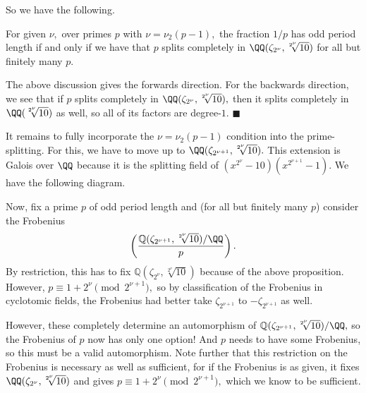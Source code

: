 So we have the following.
\begin{proposition}
    For given $\nu,$ over primes $p$ with $\nu=\nu_2(p-1),$ the fraction $1/p$ has odd period length if and only if we have that $p$ splits completely in $\QQ(\zeta_{2^\nu},\sqrt[2^\nu]{10})$ for all but finitely many $p.$
\end{proposition}
The above discussion gives the forwards direction. For the backwards direction, we see that if $p$ splits completely in $\QQ(\zeta_{2^\nu},\sqrt[2^\nu]{10}),$ then it splits completely in $\QQ(\sqrt[2^\nu]{10})$ as well, so all of its factors are degree-$1.$ $\blacksquare$

It remains to fully incorporate the $\nu=\nu_2(p-1)$ condition into the prime-splitting. For this, we have to move up to $\QQ(\zeta_{2^{\nu+1}},\sqrt[2^\nu]{10}).$ This extension is Galois over $\QQ$ because it is the splitting field of $\left(x^{2^\nu}-10\right)\left(x^{2^{\nu+1}}-1\right).$ We have the following diagram.
\begin{center}
\end{center}
Now, fix a prime $p$ of odd period length and (for all but finitely many $p$) consider the Frobenius
\[\left(\frac{\mathbb Q(\zeta_{2^{\nu+1}},\sqrt[2^\nu]{10})/\QQ}p\right).\]
By restriction, this has to fix $\mathbb Q(\zeta_{2^\nu},\sqrt[2^\nu]{10})$ because of the above proposition. However, $p\equiv1+2^\nu\pmod{2^{\nu+1}},$ so by classification of the Frobenius in cyclotomic fields, the Frobenius had better take $\zeta_{2^{\nu+1}}$ to $-\zeta_{2^{\nu+1}}$ as well.

However, these completely determine an automorphism of $\mathbb Q(\zeta_{2^{\nu+1}},\sqrt[2^\nu]{10})/\QQ,$ so the Frobenius of $p$ now has only one option! And $p$ needs to have some Frobenius, so this must be a valid automorphism. Note further that this restriction on the Frobenius is necessary as well as sufficient, for if the Frobenius is as given, it fixes $\QQ(\zeta_{2^\nu},\sqrt[2^\nu]{10})$ and gives $p\equiv1+2^{\nu}\pmod{2^{\nu+1}},$ which we know to be sufficient.

